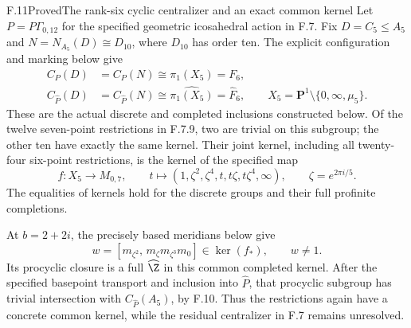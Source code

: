 \begin{claim}{F.11}{Proved}{The rank-six cyclic centralizer and an exact common kernel}
Let $P=P\Gamma_{0,12}$ for the specified geometric
icosahedral action in F.7.  Fix $D=C_5\leq A_5$ and
$N=N_{A_5}(D)\cong D_{10}$, where $D_{10}$ has order ten.
The explicit configuration and marking below give
\[
 \begin{split}
 C_P(D)&=C_P(N)\cong\pi_1(X_5)=F_6,\\
 C_{\widehat P}(D)&=C_{\widehat P}(N)
                  \cong\widehat{\pi_1(X_5)}=\widehat F_6,
 \qquad
 X_5=\mathbf P^1\setminus\{0,\infty,\mu_5\}.
 \end{split}                                                   \tag{F.11.1}
\]
These are the actual discrete and completed inclusions
constructed below.  Of the twelve seven-point restrictions
in F.7.9, two are trivial on this subgroup; the other ten
have exactly the same kernel.  Their joint kernel, including
all twenty-four six-point restrictions, is the kernel of
the specified map
\[
 f:X_5\longrightarrow M_{0,7},\qquad
 t\longmapsto
 (1,\zeta^2,\zeta^4,t,t\zeta,t\zeta^4,\infty),
 \qquad \zeta=e^{2\pi i/5}.                                  \tag{F.11.2}
\]
The equalities of kernels hold for the discrete groups
and their full profinite completions.

At $b=2+2i$, the precisely based meridians below give
\[
          w=[m_{\zeta^2},\,m_\zeta m_{\zeta^3}m_0]
                    \in\ker(f_*),\qquad w\ne1.               \tag{F.11.3}
\]
Its procyclic closure is a full $\widehat\Z$ in this
common completed kernel.  After the specified basepoint
transport and inclusion into $\widehat P$, that
procyclic subgroup has trivial intersection with
$C_{\widehat P}(A_5)$, by F.10.  Thus the restrictions
again have a concrete common kernel, while the residual
centralizer in F.7 remains unresolved.
\end{claim}


